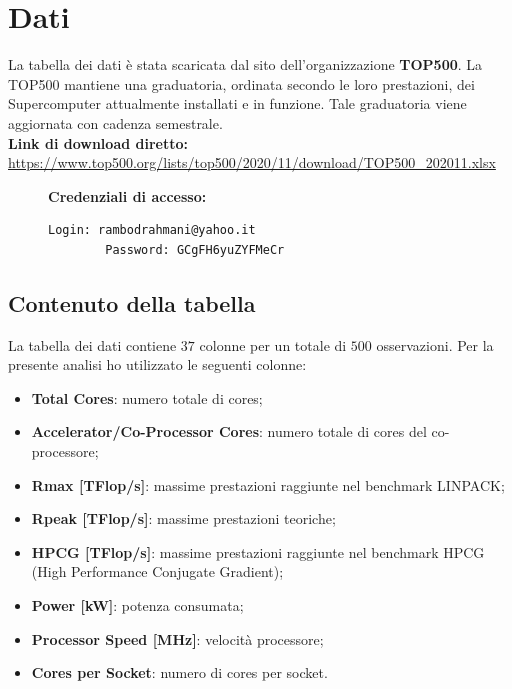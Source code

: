 \documentclass[11pt,a4paper]{article}
\begin{document}
\section{Dati}
La tabella dei dati \`e stata scaricata dal sito dell'organizzazione
\textbf{TOP500}. La TOP500 mantiene una graduatoria, ordinata secondo le loro
prestazioni, dei Supercomputer attualmente installati e in funzione. Tale
graduatoria viene aggiornata con cadenza semestrale.\\
\textbf{Link di download diretto:} \url{https://www.top500.org/lists/top500/2020/11/download/TOP500_202011.xlsx}\\
\begin{figure}[h]
	\vspace{-1cm}
	\begin{minipage}{.3\textwidth}
		\textbf{Credenziali di accesso:}
	\end{minipage}
	\begin{minipage}{0.7\textwidth} 
		\begin{lstlisting}[language=bash,tabsize=2,backgroundcolor=\color{Goldenrod}]
		Login: rambodrahmani@yahoo.it
		Password: GCgFH6yuZYFMeCr
		\end{lstlisting}
	\end{minipage}
	\vspace{-1cm}
\end{figure}
\subsection{Contenuto della tabella}
La tabella dei dati contiene $37$ colonne per un totale di $500$ osservazioni.
Per la presente analisi ho utilizzato le seguenti colonne:
\begin{itemize}
	\setlength\itemsep{0mm}
	\item \textbf{Total Cores}: numero totale di cores;
	\item \textbf{Accelerator/Co-Processor Cores}: numero totale di
		cores del co-processore;
	\item \textbf{Rmax [TFlop/s]}: massime prestazioni raggiunte nel
		benchmark LINPACK;
	\item \textbf{Rpeak [TFlop/s]}: massime prestazioni teoriche;
	\item \textbf{HPCG [TFlop/s]}: massime prestazioni raggiunte nel
		benchmark HPCG (High Performance Conjugate Gradient);
	\item \textbf{Power [kW]}: potenza consumata;
	\item \textbf{Processor Speed [MHz]}: velocit\`a processore;
	\item \textbf{Cores per Socket}: numero di cores per socket.
\end{itemize}
\end{document}
